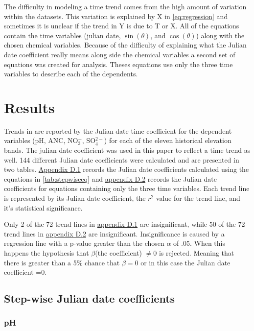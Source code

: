 

The difficulty in modeling a time trend comes from the high amount of variation within the datasets.  
This variation is explained by X in \autoref{eq:regression} and sometimes it is unclear if the trend in Y is due to T or X.
All of the equations contain the time variables (julian date, $\sin(\theta)$, and $\cos(\theta)$) along with the chosen chemical variables.  
Because of the difficulty of explaining what the Julian date coefficient really means along side the chemical variables a second set of equations was created for analysis.
Theses equations use only the three time variables to describe each of the dependents.

\section{Results}
Trends in \citet{robinson2008ph} are reported by the Julian date time coefficient for the dependent variables (pH, ANC, NO$_3^-$, SO$_4^{2-}$)  for each of the eleven historical elevation bands.
The julian date coefficient was used in this paper to reflect a time trend as well.
144 different Julian date coefficients were calculated and are presented in two tables.  
\hyperref[app:Step-wise julian date]{Appendix D.1} records the Julian date coefficients calculated using the equations in \autoref{tab:stepwiseeq}  and \hyperref[app:time vars]{appendix D.2} records the Julian date coefficients for  equations containing only the three time variables.  
Each trend line is represented by its Julian date coefficient, the $r^2$ value for the trend line, and it's statistical significance.

Only 2 of the 72 trend lines in \hyperref[app:Step-wise julian date]{appendix D.1} are insignificant, while 50 of the 72 trend lines in  \hyperref[app:time vars]{appendix D.2} are insignificant.  
Insignificance is caused by a regression line with a p-value greater than the chosen $\alpha$ of .05.
When this happens the hypothesis that $\beta$(the coefficient) $\neq 0$  is rejected.
Meaning that there is greater than a 5$\%$ chance that $\beta=0$ or in this case the Julian date coefficient =0. 

\subsection{Step-wise Julian date coefficients}

\subsubsection{pH}

